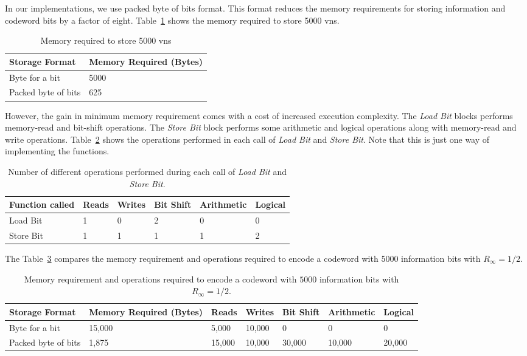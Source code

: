 In our implementations, we use packed byte of bits format. This format reduces the memory requirements for storing information and codeword bits by a factor of eight. Table~\ref{tab:mem_req} shows the memory required to store 5000 \glspl{vn}.
\begin{table}[htbp]
  \centering
  \begin{tabular}{|l|l|}
    \hline
    \textbf{Storage Format} &\textbf{Memory Required (Bytes)}\\
    \hline
    \hline
    Byte for a bit &5000\\
    \hline
    Packed byte of bits &625\\
    \hline
  \end{tabular}
  \caption{Memory required to store 5000 \glspl{vn}}
  \label{tab:mem_req}
\end{table}

However, the gain in minimum memory requirement comes with a cost of increased execution complexity. The \emph{Load Bit} blocks performs memory-read and bit-shift operations. The \emph{Store Bit} block performs some arithmetic and logical operations along with memory-read and write operations. Table~\ref{tab:load_store} shows the operations performed in each call of \emph{Load Bit} and \emph{Store Bit}. Note that this is just one way of implementing the functions.
\begin{table}[htbp]
  \centering
  \begin{tabular}{|l|l|l|l|l|l|}
    \hline
    \textbf{Function called} &\textbf{Reads} &\textbf{Writes} &\textbf{Bit Shift} &\textbf{Arithmetic} &\textbf{Logical}\\
    \hline
    \hline
    Load Bit &1 &0 &2 &0 &0\\
    \hline
    Store Bit &1 &1 &1 &1 &2\\
    \hline
  \end{tabular}
  \caption{Number of different operations performed during each call of \emph{Load Bit} and \emph{Store Bit}.}
  \label{tab:load_store}
\end{table}

The Table~\ref{tab:summ_mem_req} compares the memory requirement and operations required to encode a codeword with 5000 information bits with $R_\infty=1/2$.
\begin{table}[htbp]
  \centering
  \begin{tabular}{|l|l|l|l|l|l|l|}
    \hline
    \textbf{Storage Format} &\textbf{Memory Required (Bytes)} &\textbf{Reads} &\textbf{Writes} &\textbf{Bit Shift} &\textbf{Arithmetic} &\textbf{Logical}\\
    \hline
    \hline
    Byte for a bit &15,000 &5,000 &10,000 &0 &0 &0\\
    \hline
    Packed byte of bits &1,875 &15,000 &10,000 &30,000 &10,000 &20,000\\
    \hline
  \end{tabular}
  \caption{Memory requirement and operations required to encode a codeword with $5000$ information bits with $R_\infty=1/2$.}
  \label{tab:summ_mem_req}
\end{table}


